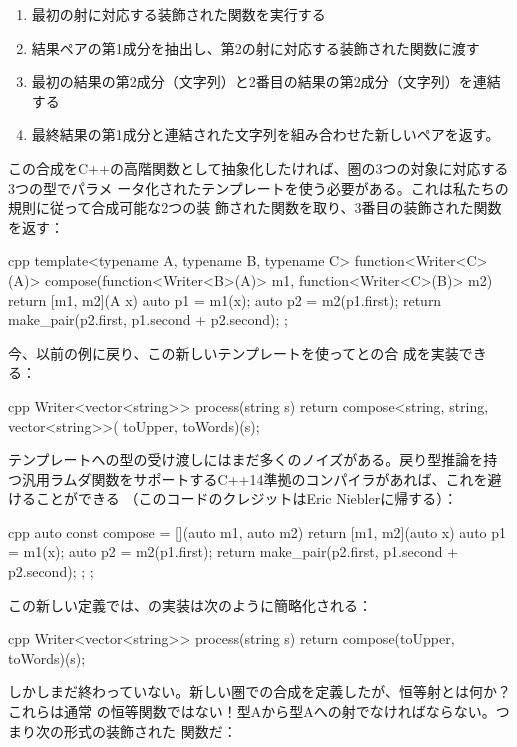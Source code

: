 \begin{enumerate}
  \tightlist
  \item
        最初の射に対応する装飾された関数を実行する
  \item
        結果ペアの第1成分を抽出し、第2の射に対応する装飾された関数に渡す
  \item
        最初の結果の第2成分（文字列）と2番目の結果の第2成分（文字列）を連結する
  \item
        最終結果の第1成分と連結された文字列を組み合わせた新しいペアを返す。
\end{enumerate}

この合成をC++の高階関数として抽象化したければ、圏の3つの対象に対応する3つの型でパラメ
ータ化されたテンプレートを使う必要がある。これは私たちの規則に従って合成可能な2つの装
飾された関数を取り、3番目の装飾された関数を返す：

\begin{snip}{cpp}
template<typename A, typename B, typename C>
function<Writer<C>(A)> compose(function<Writer<B>(A)> m1,
                               function<Writer<C>(B)> m2)
{
    return [m1, m2](A x) {
        auto p1 = m1(x);
        auto p2 = m2(p1.first);
        return make_pair(p2.first, p1.second + p2.second);
    };
}
\end{snip}
今、以前の例に戻り、この新しいテンプレートを使ってとの合
成を実装できる：

\begin{snip}{cpp}
Writer<vector<string>> process(string s) {
    return compose<string, string, vector<string>>(
        toUpper, toWords)(s);
}
\end{snip}
テンプレートへの型の受け渡しにはまだ多くのノイズがある。戻り型推論を持
つ汎用ラムダ関数をサポートするC++14準拠のコンパイラがあれば、これを避けることができる
（このコードのクレジットはEric Nieblerに帰する）：

\begin{snip}{cpp}
auto const compose = [](auto m1, auto m2) {
    return [m1, m2](auto x) {
        auto p1 = m1(x);
        auto p2 = m2(p1.first);
        return make_pair(p2.first, p1.second + p2.second);
    };
};
\end{snip}
この新しい定義では、の実装は次のように簡略化される：

\begin{snip}{cpp}
Writer<vector<string>> process(string s) {
    return compose(toUpper, toWords)(s);
}
\end{snip}
しかしまだ終わっていない。新しい圏での合成を定義したが、恒等射とは何か？これらは通常
の恒等関数ではない！型Aから型Aへの射でなければならない。つまり次の形式の装飾された
関数だ：

